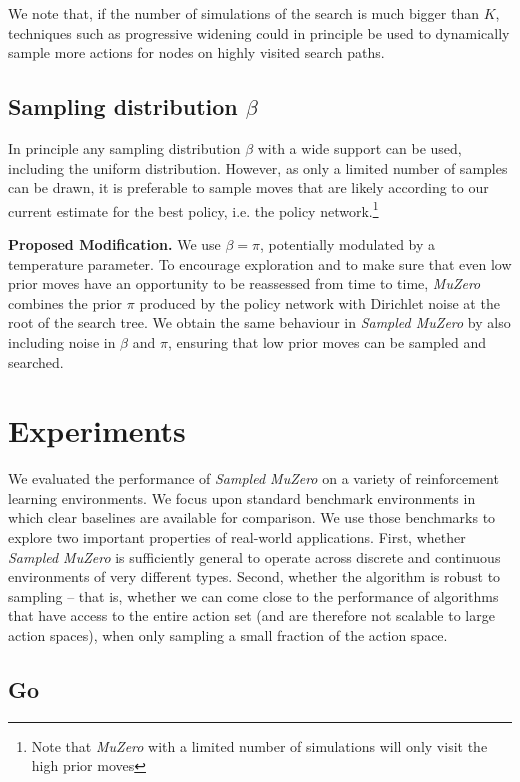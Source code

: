 \documentclass{article}
\newcommand{\muzero}{\emph{MuZero}}
\newcommand{\smuzero}{\emph{Sampled MuZero}}
\newcommand{\sample}{\beta}
\begin{document}
We note that, if the number of simulations of the search is much bigger than $K$, techniques such as progressive widening \cite{progressive_widening} could in principle be used to dynamically sample more actions for nodes on highly visited search paths.

\subsection{Sampling distribution $\sample$}

In principle any sampling distribution $\sample$ with a wide support can be used, including the uniform distribution. However, as only a limited number of samples can be drawn, it is preferable to sample moves that are likely according to our current estimate for the best policy, i.e. the policy network.\footnote{Note that \muzero{} with a limited number of simulations will only visit the high prior moves}

\textbf{Proposed Modification.}
We use $\sample=\pi$, potentially modulated by a temperature parameter. To encourage exploration and to make sure that even low prior moves have an opportunity to be reassessed from time to time, \muzero{} combines the prior $\pi$ produced by the policy network with Dirichlet noise at the root of the search tree. We obtain the same behaviour in \smuzero{} by also including noise in $\sample$ and $\pi$, ensuring that low prior moves can be sampled and searched.

\section{Experiments}

We evaluated the performance of \smuzero{} on a variety of reinforcement learning environments. We focus upon standard benchmark environments in which clear baselines are available for comparison. We use those benchmarks to explore two important properties of real-world applications. First, whether \smuzero{} is sufficiently general to operate across discrete and continuous environments of very different types. Second, whether the algorithm is robust to sampling -- that is, whether we can come close to the performance of algorithms that have access to the entire action set (and are therefore not scalable to large action spaces), when only sampling a small fraction of the action space.

\subsection{Go}
\end{document}
